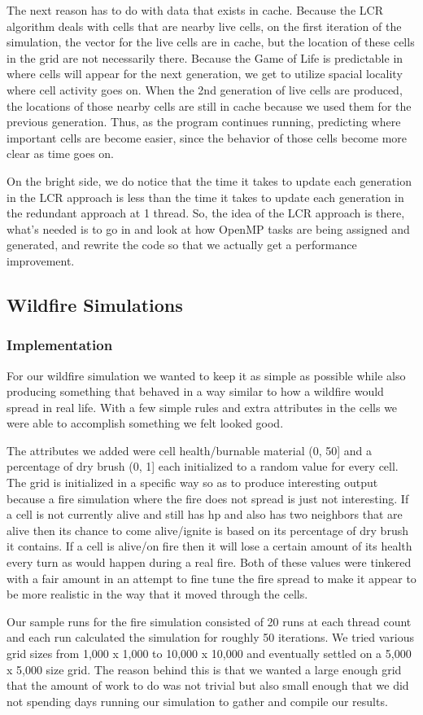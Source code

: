 \documentclass[12pt]{article}
\begin{document}
The next reason has to do with data that exists in cache. Because the LCR algorithm deals with cells that are nearby live cells, on the first iteration of the simulation, the vector for the live cells are in cache, but the location of these cells in the grid are not necessarily there. Because the Game of Life is predictable in where cells will appear for the next generation, we get to utilize spacial locality where cell activity goes on. When the 2nd generation of live cells are produced, the locations of those nearby cells are still in cache because we used them for the previous generation. Thus, as the program continues running, predicting where important cells are become easier, since the behavior of those cells become more clear as time goes on.

On the bright side, we do notice that the time it takes to update each generation in the LCR approach is less than the time it takes to update each generation in the redundant approach at 1 thread. So, the idea of the LCR approach is there, what's needed is to go in and look at how OpenMP tasks are being assigned and generated, and rewrite the code so that we actually get a performance improvement.

\subsection{Wildfire Simulations}

\subsubsection{Implementation}
For our wildfire simulation we wanted to keep it as simple as possible while also producing something that behaved in a way similar to how a wildfire would spread in real life. With a few simple rules and extra attributes in the cells we were able to accomplish something we felt looked good.
\par
The attributes we added were cell health/burnable material (0, 50] and a percentage of dry brush (0, 1] each initialized to a random value for every cell. The grid is initialized in a specific way so as to produce interesting output because a fire simulation where the fire does not spread is just not interesting. If a cell is not currently alive and still has hp and also has two neighbors that are alive then its chance to come alive/ignite is based on its percentage of dry brush it contains. If a cell is alive/on fire then it will lose a certain amount of its health every turn as would happen during a real fire. Both of these values were tinkered with a fair amount in an attempt to fine tune the fire spread to make it appear to be more realistic in the way that it moved through the cells. 
\par
Our sample runs for the fire simulation consisted of 20 runs at each thread count and each run calculated the simulation for roughly 50 iterations. We tried various grid sizes from 1,000 x 1,000 to 10,000 x 10,000 and eventually settled on a 5,000 x 5,000 size grid. The reason behind this is that we wanted a large enough grid that the amount of work to do was not trivial but also small enough that we did not spending days running our simulation to gather and compile our results. 
\end{document}

